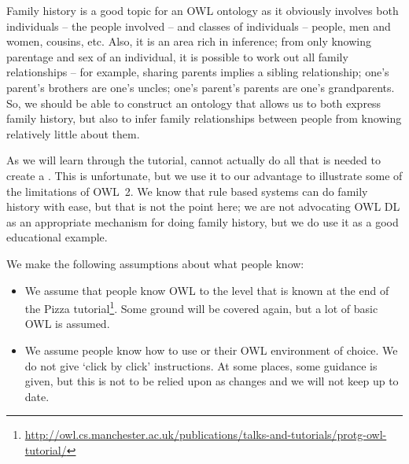 Family history is a good topic for an OWL  ontology as it obviously involves both individuals -- the people involved -- and classes of individuals -- people, men and women, cousins, etc. Also, it is an area rich in inference; from only knowing parentage and sex of an individual, it is possible to work out all family relationships -- for example, sharing parents implies a sibling relationship; one's parent's brothers are one's uncles; one's parent's parents are one's grandparents. So, we should be able to construct an ontology that allows us to both express family history, but also to infer family relationships between people from knowing relatively little about them.

As we will learn through the tutorial, \owlii cannot actually do all that is needed to create a \fhkb. This is unfortunate, but we use it to our advantage to illustrate some of the limitations of OWL~2. We know that rule based systems can do family history with ease, but that is not the point here; we are not advocating OWL DL as an appropriate mechanism for doing family history, but we do use it as a good educational example.

We make the following assumptions about what people know:
\begin{itemize}
\item We assume that people know OWL to the level that is known at the end of the Pizza tutorial\footnote{\url{http://owl.cs.manchester.ac.uk/publications/talks-and-tutorials/protg-owl-tutorial/}}. Some ground will be covered again, but a lot of basic OWL is assumed.
\item We assume people know how to use \protege or their OWL environment of choice. We do not give `click by click' instructions. At some places, some guidance is given, but this is not to be relied upon as \protege changes and we will not keep up to date.
\end{itemize}

